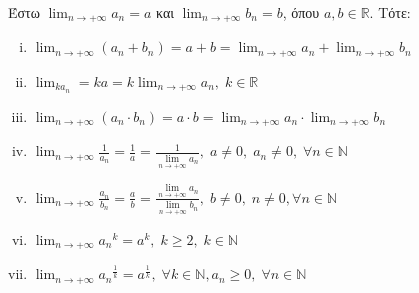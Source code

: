 \documentclass[main.tex]{subfiles}
\begin{document}
\begin{prop}
    Έστω $ \lim_{n \to +\infty} a_{n} = a$ και $ \lim_{n \to +\infty} 
    b_{n} = b $, όπου $ a,b \in \mathbb{R} $. Τότε:
    \begin{enumerate}[i)]
        \item $ \lim_{n \to +\infty} (a_{n} + b_{n}) = a+b = 
            \lim_{n \to +\infty} a_{n} + \lim_{n \to +\infty} b_{n} $
        \item $ \lim_{k a_{n}} = ka = k \lim_{n \to +\infty} a_{n}, \; 
            k \in \mathbb{R} $
        \item $ \lim_{n \to +\infty} (a_{n}\cdot b_{n}) = a\cdot b = 
            \lim_{n \to +\infty} a_{n}\cdot \lim_{n \to +\infty} b_{n}$
        \item $ \lim_{n \to +\infty} \frac{1}{a_{n}} = \frac{1}{a} = 
            \frac{1}{\lim\limits_{n \to +\infty}
            a_{n}}, \; a \neq 0, \; a_{n} \neq 0, \; \forall n \in 
            \mathbb{N}  $
        \item $ \lim_{n \to +\infty} \frac{a_{n}}{b_{n}} = \frac{a}{b} 
            = \frac{\lim\limits_{n \to +\infty} a_{n}}
            {\lim\limits_{n \to +\infty} 
            b_{n}}, \; b \neq 0, \; n \neq 0, \forall n \in \mathbb{N} $
        \item $ \lim_{n \to +\infty} {a_{n}}^{k} = a^{k}, 
            \; k \geq 2, \; k \in \mathbb{N}  $  
    \item $ \lim_{n \to +\infty} {a_{n}}^{\frac{1}{k}}
            =a^{\frac{1}{k}}, \; \forall k \in 
            \mathbb{N}, a_{n} \geq 0, \; \forall n \in \mathbb{N} $
    \end{enumerate}
\end{prop}
\end{document}
